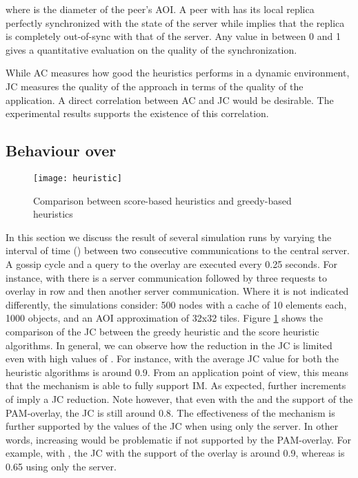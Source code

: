 \documentclass[final,10pt,a5paper]{phdimt}
\theoremstyle{definition}
\begin{document}
\noindent
where  is the diameter of the peer's AOI.
A peer with  has its local replica perfectly synchronized with the state of the server while
 implies that the replica is completely out-of-sync with that of the server. Any value in between 0 and 1 gives a quantitative evaluation on the quality of the synchronization.

While AC measures how good the heuristics performs in a dynamic environment, JC measures the quality of the approach in terms of the quality of the application. A direct correlation between AC and JC would be desirable. 
The experimental results supports the existence of this correlation.



\subsection{Behaviour over }

\begin{figure}[tbh]
\centering
\texttt{[image: heuristic]}
\caption{Comparison between score-based heuristics and greedy-based heuristics}
\label{graph:heur}
\end{figure}


In this section we discuss the result of several simulation runs by varying the interval of time () between two consecutive communications to the central server. A gossip cycle and a query to the overlay are executed every 0.25 seconds. For instance, with  there is a server communication followed by three requests to overlay in row and then another server communication. 
Where it is not indicated differently, the simulations consider: 500 nodes with a cache of 10 elements each, 1000 objects, and an AOI approximation of 32x32 tiles. 
Figure \ref{graph:heur} shows the comparison of the JC between the greedy heuristic and the score heuristic algorithms.
In general, we can observe how the reduction in the JC is limited even with high values of .
For instance, with  the average JC value for both the heuristic algorithms is around 0.9.
From an application point of view, this means that the mechanism is able to fully support IM.
As expected, further increments of  imply a JC reduction. Note however, that even with the  and the support of the PAM-overlay, the JC is still around 0.8.
The effectiveness of the mechanism is further supported by the values of the JC when using only the server.
In other words, increasing  would be problematic if not supported by the PAM-overlay. For example, with , the JC with the support of the overlay is around 0.9, whereas is 0.65 using only the server.
\end{document}
